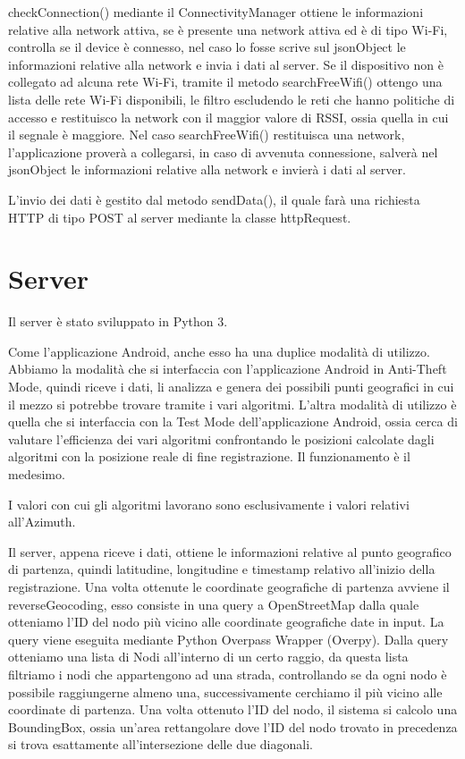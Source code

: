 \documentclass[12pt,a4paper,openright,twoside]{report}
\begin{document}
checkConnection() mediante il ConnectivityManager ottiene le informazioni relative alla network attiva, se è presente una network attiva ed è di tipo Wi-Fi, controlla se il device è connesso, nel caso lo fosse scrive sul jsonObject le informazioni relative alla network e invia i dati al server.
Se il dispositivo non è collegato ad alcuna rete Wi-Fi, tramite il metodo searchFreeWifi() ottengo una lista delle rete Wi-Fi disponibili, le filtro escludendo le reti che hanno politiche di accesso e restituisco la network con il maggior valore di RSSI, ossia quella in cui il segnale è maggiore. 
Nel caso searchFreeWifi() restituisca una network, l'applicazione proverà a collegarsi, in caso di avvenuta connessione, salverà nel jsonObject le informazioni relative alla network e invierà i dati al server.

L'invio dei dati è gestito dal metodo sendData(), il quale farà una richiesta HTTP di tipo POST al server mediante la classe httpRequest.

\newpage
\section{Server}
Il server è stato sviluppato in Python 3.

Come l'applicazione Android, anche esso ha una duplice modalità di utilizzo. Abbiamo la modalità che si interfaccia con l'applicazione Android in Anti-Theft Mode, quindi riceve i dati, li analizza e genera dei possibili punti geografici in cui il mezzo si potrebbe trovare tramite i vari algoritmi. L'altra modalità di utilizzo è quella che si interfaccia con la Test Mode dell'applicazione Android, ossia cerca di valutare l'efficienza dei vari algoritmi confrontando le posizioni calcolate dagli algoritmi con la posizione reale di fine registrazione. 
Il funzionamento è il medesimo.

I valori con cui gli algoritmi lavorano sono esclusivamente i valori relativi all'Azimuth.

Il server, appena riceve i dati, ottiene le informazioni relative al punto geografico di partenza, quindi latitudine, longitudine e timestamp relativo all'inizio della registrazione.
Una volta ottenute le coordinate geografiche di partenza avviene il reverseGeocoding, esso consiste in una query a OpenStreetMap dalla quale otteniamo l'ID del nodo più vicino alle coordinate geografiche date in input. La query viene eseguita mediante Python Overpass Wrapper (Overpy). Dalla query otteniamo una lista di Nodi all'interno di un certo raggio, da questa lista filtriamo i nodi che appartengono ad una strada, controllando se da ogni nodo è possibile raggiungerne almeno una, successivamente cerchiamo il più vicino alle coordinate di partenza.
Una volta ottenuto l'ID del nodo, il sistema si calcolo una BoundingBox, ossia un'area rettangolare dove l'ID del nodo trovato in precedenza si trova esattamente all'intersezione delle due diagonali. 
\end{document}
